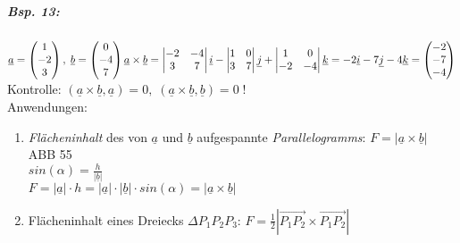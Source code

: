 \subparagraph{Bsp. 13:}\parskp
$\underline{a}=\begin{pmatrix}
1\\
-2\\
3
\end{pmatrix}, \; \underline{b}= \begin{pmatrix}
0\\
-4\\
7
\end{pmatrix}\\
\underline{a}\times \underline{b} = \begin{vmatrix}
-2 & -4\\
3 & 7
\end{vmatrix}\underline{i}- \begin{vmatrix}
1 & 0 \\
3 & 7
\end{vmatrix} \underline{j}+ \begin{vmatrix}
1 & 0\\
-2 & -4
\end{vmatrix} \underline{k}= -2 \underline{i} -7 \underline{j} - 4 \underline{k}= \begin{pmatrix}
-2\\
-7\\
-4
\end{pmatrix}$\\
Kontrolle: $(\underline{a} \times \underline{b}, \underline{a})=0, \; (\underline{a} \times \underline{b}, \underline{b})=0 \; !$\bigskip\\
Anwendungen:
\begin{enumerate}
\item \emph{Flächeninhalt} des von $\underline{a}$ und $\underline{b}$ aufgespannte \emph{Parallelogramms}: $\boxed{F=|\underline{a} \times \underline{b}|}$\\
ABB 55\\
$sin(\alpha)=\frac{h}{|\underline{b}|}$\\
$F=|\underline{a}|\cdot h = |\underline{a}| \cdot |\underline{b}| \cdot sin(\alpha)=|\underline{a} \times \underline{b}|$
\item Flächeninhalt eines Dreiecks $\Delta P_1P_2P_3$: $\boxed{F= \frac{1}{2}\left|\overrightarrow{P_1P_2}\times \overrightarrow{P_1P_2}\right|}$
\end{enumerate}


